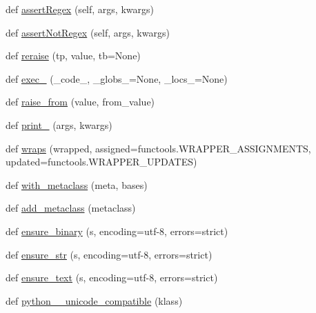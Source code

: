 \begin{DoxyCompactItemize}
def \hyperlink{namespacesix_a772ce739f442ee3640abf1c0bf091749}{assert\+Regex} (self, args, kwargs)
\item 
def \hyperlink{namespacesix_a0f0f9c822f296051be9a059fbc389a50}{assert\+Not\+Regex} (self, args, kwargs)
\item 
def \hyperlink{namespacesix_ae8a8e80e2dabc3c2bc2d8a582cfcc43d}{reraise} (tp, value, tb=None)
\item 
def \hyperlink{namespacesix_a5151099b4e703601f34a658d42c14100}{exec\+\_\+} (\+\_\+code\+\_\+, \+\_\+globs\+\_\+=None, \+\_\+locs\+\_\+=None)
\item 
def \hyperlink{namespacesix_a5321131a67ed38a6ffef95beebc1c334}{raise\+\_\+from} (value, from\+\_\+value)
\item 
def \hyperlink{namespacesix_ad04fa7d5b6867bc3d14c6cac60116ced}{print\+\_\+} (args, kwargs)
\item 
def \hyperlink{namespacesix_ac61e4b217e98112323ac2335dc9e2e99}{wraps} (wrapped, assigned=functools.\+W\+R\+A\+P\+P\+E\+R\+\_\+\+A\+S\+S\+I\+G\+N\+M\+E\+N\+TS, updated=functools.\+W\+R\+A\+P\+P\+E\+R\+\_\+\+U\+P\+D\+A\+T\+ES)
\item 
def \hyperlink{namespacesix_af599400254a842b0a0fc5dab5bcbe8a4}{with\+\_\+metaclass} (meta, bases)
\item 
def \hyperlink{namespacesix_ac92c20d6dc6979883b76fc6cf43f44b8}{add\+\_\+metaclass} (metaclass)
\item 
def \hyperlink{namespacesix_a84ffe7d0757c91601ac284101b2d96c6}{ensure\+\_\+binary} (s, encoding=\textquotesingle{}utf-\/8\textquotesingle{}, errors=\textquotesingle{}strict\textquotesingle{})
\item 
def \hyperlink{namespacesix_a14c8c004795ea0da2f1b7650bab174bf}{ensure\+\_\+str} (s, encoding=\textquotesingle{}utf-\/8\textquotesingle{}, errors=\textquotesingle{}strict\textquotesingle{})
\item 
def \hyperlink{namespacesix_abbbb070dd44999d80cf2dbf469cbee20}{ensure\+\_\+text} (s, encoding=\textquotesingle{}utf-\/8\textquotesingle{}, errors=\textquotesingle{}strict\textquotesingle{})
\item 
def \hyperlink{namespacesix_a341d28e4b5838a614702f1b01b9ce39d}{python\+\_\+\_\+unicode\+\_\+compatible} (klass)
\end{DoxyCompactItemize}
